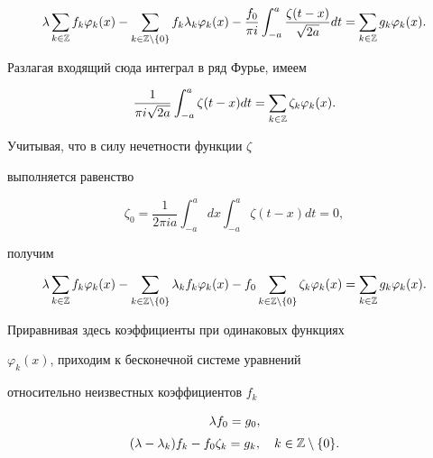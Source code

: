 $$


\lambda\sum_{k\in \Bbb{Z}}f_{k}\varphi_{k}(x)-


\sum_{k\in \Bbb{Z}\setminus \{0\}}f_{k}


\lambda_{k}\varphi_{k}(x)-\dfrac{f_{0}}{\pi i}


\int^{a}_{-a}\dfrac{\zeta(t-x)}{\sqrt{2a}}dt=


\sum_{k\in \Bbb{Z}}g_{k}\varphi_{k}(x).


$$


Разлагая входящий сюда интеграл в ряд Фурье, имеем


$$


\dfrac{1}{\pi i\sqrt{2a}}\int^{a}_{-a}\zeta(t-x)dt=


\sum_{k\in \Bbb{Z}}\zeta_{k}\varphi_{k}(x).


$$


Учитывая, что в силу нечетности функции $\zeta$


выполняется равенство


$$


\zeta_{0}=\dfrac{1}{2\pi ia}\int^{a}_{-a}dx


\int^{a}_{-a}\zeta(t-x)dt=0,


$$


получим


$$


\lambda\sum_{k\in \Bbb{Z}}f_{k}\varphi_{k}(x)-


\sum_{k\in \Bbb{Z}\setminus \{0\}}\lambda_{k}f_{k}


\varphi_{k}(x)-f_{0}\sum_{k\in \Bbb{Z}\setminus


\{0\}}\zeta_{k}\varphi_{k}(x)=


\sum_{k\in \Bbb{Z}}g_{k}\varphi_{k}(x).


$$


Приравнивая здесь коэффициенты при одинаковых функциях


$\varphi_{k}(x)$, приходим к бесконечной системе уравнений


относительно неизвестных коэффициентов $f_{k}$


\begin{equation}


\begin{array}{c}


\lambda f_{0}=g_{0}, \\[2mm]


(\lambda-\lambda_{k})f_{k}-f_{0}\zeta_{k}=g_{k},


\quad k\in \Bbb{Z}\setminus\{0\}.


\end{array}


\end{equation}


